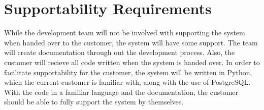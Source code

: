 \section{Supportability Requirements}
While the development team will not be involved with supporting the system when handed over to the customer, the system will have some support.  The team will create documentation through out the development process. Also, the customer will recieve all code written when the system is handed over.  In order to facilitate supportability for the customer, the system will be written in Python, which the current customer is familiar with, along with the use of PostgreSQL.  With the code in a familiar language and the documentation, the customer should be able to fully support the system by themselves.
